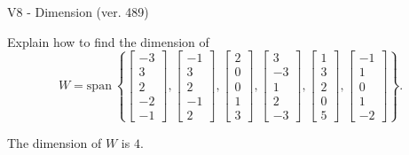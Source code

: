 \begin{exercise}
  \begin{exerciseTitle}V8 - Dimension (ver. 489)\end{exerciseTitle}
  \begin{exerciseStatement}
    Explain how to find the dimension of 
\[W=\mathrm{span}\ \left\{\left[\begin{array}{r}
-3 \\
3 \\
2 \\
-2 \\
-1
\end{array}\right] , \left[\begin{array}{r}
-1 \\
3 \\
2 \\
-1 \\
2
\end{array}\right] , \left[\begin{array}{r}
2 \\
0 \\
0 \\
1 \\
3
\end{array}\right] , \left[\begin{array}{r}
3 \\
-3 \\
1 \\
2 \\
-3
\end{array}\right] , \left[\begin{array}{r}
1 \\
3 \\
2 \\
0 \\
5
\end{array}\right] , \left[\begin{array}{r}
-1 \\
1 \\
0 \\
1 \\
-2
\end{array}\right]\right\}.\]



  \end{exerciseStatement}
  \begin{exerciseAnswer}
   The dimension of \(W\) is  \(4\).
  


  \end{exerciseAnswer}
\end{exercise}